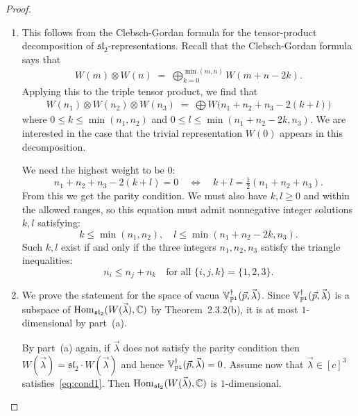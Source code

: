 \documentclass[12pt]{article}
\begin{document}
\begin{proof}
    \leavevmode
    \begin{enumerate}
        \item This follows from the Clebsch-Gordan formula for the tensor-product decomposition of $\mathfrak{sl}_2$-representations. Recall that the Clebsch-Gordan formula says that \begin{align*}
                  W(m)\otimes W(n) \;=\;\bigoplus_{k=0}^{\min(m,n)} W(m+n-2k). \end{align*} Applying this to the triple tensor product, we find that \begin{align*}
                  W(n_1)\otimes W(n_2)\otimes W(n_3)
                  \;=\;
                  \bigoplus W\bigl(n_1+n_2+n_3-2(k+l)\bigr)
            \end{align*} where $0\le k\le\min(n_1,n_2)$ and $0\le l\le\min(n_1+n_2-2k,n_3)$. We are interested in the case that the trivial representation $W(0)$ appears in this decomposition.

            We need the highest weight to be 0:
            \[
            n_1+n_2+n_3-2(k+l)=0
            \quad\Longleftrightarrow\quad
            k+l = \tfrac{1}{2}(n_1+n_2+n_3).
            \]
From this we get the parity condition. We must also have $k,l\ge0$ and within the allowed ranges, so this equation must admit nonnegative integer solutions $k,l$ satisfying:
            \[
            k\le\min(n_1,n_2), \quad l\le\min(n_1+n_2-2k,n_3).
            \]
            Such $k,l$ exist if and only if the three integers $n_1,n_2,n_3$ satisfy the triangle inequalities:
            \[
            n_i \le n_j + n_k \quad\text{for all } \{i,j,k\}=\{1,2,3\}.
            \]
        \item We prove the statement for the space of vacua
              $\mathbb V_{\P^1}^\dagger(\vec p,\vec\lambda)$.
              Since $\mathbb V_{\P^1}^\dagger(\vec p,\vec\lambda)$
              is a subspace of
              $\Hom_{\mathfrak{sl}_2}(W(\vec\lambda),\C)$
              by Theorem~2.3.2(b),
              it is at most $1$-dimensional by part~(a).

              By part~(a) again, if $\vec\lambda$ does not satisfy the parity condition then $W(\vec\lambda)=\mathfrak{sl}_2\cdot W(\vec\lambda)$ and hence $\mathbb V_{\P^1}^\dagger(\vec p,\vec\lambda)=0$. Assume now that $\vec\lambda\in[c]^3$ satisfies~\eqref{eq:cond1}. Then $\Hom_{\mathfrak{sl}_2}(W(\vec\lambda),\C)$ is $1$-dimensional.


\end{enumerate}
\end{proof}
\end{document}
